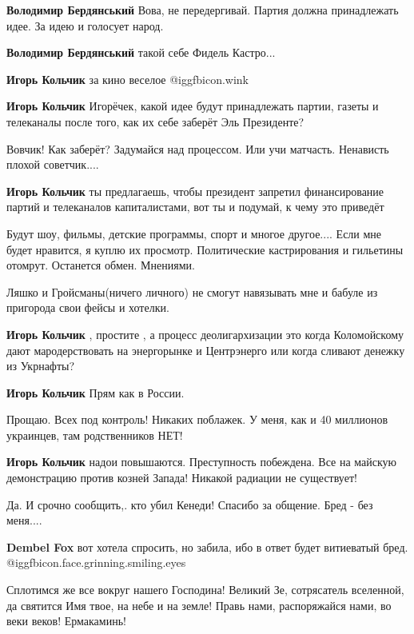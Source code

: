 \begin{itemize}
\begin{itemize}
\textbf{Володимир Бердянський} Вова, не передергивай. Партия должна принадлежать идее. За идею и голосует народ.

\textbf{Володимир Бердянський} такой себе Фидель Кастро...

\textbf{Игорь Кольчик} за кино веселое  @igg{fbicon.wink} 

\textbf{Игорь Кольчик} Игорёчек, какой идее будут принадлежать партии, газеты и телеканалы после того, как их себе заберёт Эль Президенте?

Вовчик! Как заберёт? Задумайся над процессом. Или учи матчасть. Ненависть плохой советчик....

\textbf{Игорь Кольчик} ты предлагаешь, чтобы президент запретил финансирование партий и телеканалов капиталистами, вот ты и подумай, к чему это приведёт


Будут шоу, фильмы, детские программы, спорт и многое другое.... Если мне будет
нравится, я куплю их просмотр. Политические кастрирования и гильетины отомрут.
Останется обмен. Мнениями.

Ляшко и Гройсманы(ничего личного) не смогут навязывать мне и бабуле из пригорода свои фейсы и хотелки.

\textbf{Игорь Кольчик} , простите , а процесс деолигархизации это когда Коломойскому дают мародерствовать на энергорынке и Центрэнерго или когда сливают денежку из Укрнафты?

\textbf{Игорь Кольчик} Прям как в России.

Прощаю. Всех под контроль! Никаких поблажек. У меня, как и 40 миллионов украинцев, там родственников НЕТ!

\textbf{Игорь Кольчик} надои повышаются. Преступность побеждена. Все на майскую демонстрацию против козней Запада! Никакой радиации не существует!

Да. И срочно сообщить,. кто убил Кенеди! Спасибо за общение. Бред - без меня....

\textbf{Dembel Fox} вот хотела спросить, но забила, ибо в ответ будет витиеватый бред.  @igg{fbicon.face.grinning.smiling.eyes} 

Сплотимся же все вокруг нашего Господина! Великий Зе, сотрясатель вселенной, да святится Имя твое, на небе и на земле! Правь нами, распоряжайся нами, во веки веков! Ермакаминь!


\end{itemize}
\end{itemize}
